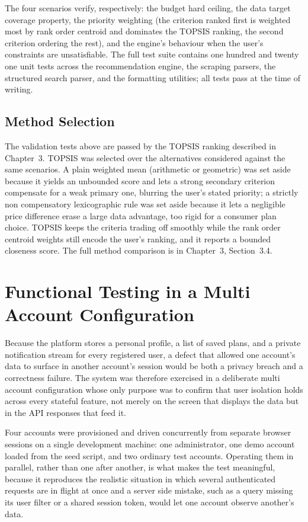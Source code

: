 The four scenarios verify, respectively: the budget hard ceiling, the data target coverage property, the priority weighting (the criterion ranked first is weighted most by rank order centroid and dominates the TOPSIS ranking, the second criterion ordering the rest), and the engine's behaviour when the user's constraints are unsatisfiable. The full test suite contains one hundred and twenty one unit tests across the recommendation engine, the scraping parsers, the structured search parser, and the formatting utilities; all tests pass at the time of writing.

\subsection{Method Selection}

The validation tests above are passed by the TOPSIS ranking described in Chapter~3. TOPSIS was selected over the alternatives considered against the same scenarios. A plain weighted mean (arithmetic or geometric) was set aside because it yields an unbounded score and lets a strong secondary criterion compensate for a weak primary one, blurring the user's stated priority; a strictly non compensatory lexicographic rule was set aside because it lets a negligible price difference erase a large data advantage, too rigid for a consumer plan choice. TOPSIS keeps the criteria trading off smoothly while the rank order centroid weights still encode the user's ranking, and it reports a bounded closeness score. The full method comparison is in Chapter~3, Section~3.4.

\section{Functional Testing in a Multi Account Configuration}

Because the platform stores a personal profile, a list of saved plans, and a private notification stream for every registered user, a defect that allowed one account's data to surface in another account's session would be both a privacy breach and a correctness failure. The system was therefore exercised in a deliberate multi account configuration whose only purpose was to confirm that user isolation holds across every stateful feature, not merely on the screen that displays the data but in the API responses that feed it.

Four accounts were provisioned and driven concurrently from separate browser sessions on a single development machine: one administrator, one demo account loaded from the seed script, and two ordinary test accounts. Operating them in parallel, rather than one after another, is what makes the test meaningful, because it reproduces the realistic situation in which several authenticated requests are in flight at once and a server side mistake, such as a query missing its user filter or a shared session token, would let one account observe another's data.

